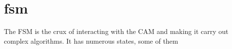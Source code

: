 \section{fsm}
The FSM is the crux of interacting with the CAM and making it carry out complex algorithms. It has numerous states, some of them